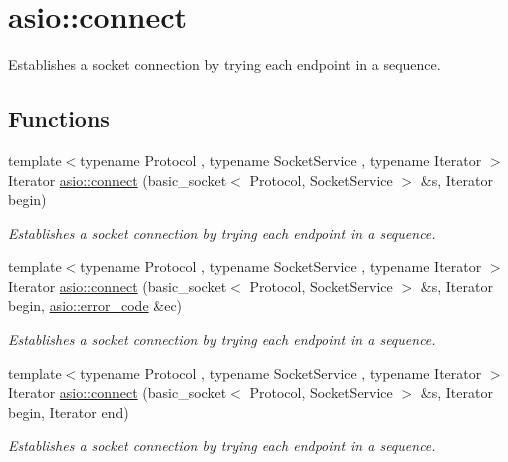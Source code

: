 \hypertarget{group__connect}{}\section{asio\+:\+:connect}
\label{group__connect}


Establishes a socket connection by trying each endpoint in a sequence.  


\subsection*{Functions}
\begin{DoxyCompactItemize}
\item 
{\footnotesize template$<$typename Protocol , typename Socket\+Service , typename Iterator $>$ }\\Iterator \hyperlink{group__connect_ga29acd61d7a875cef7dbd1f892be2906c}{asio\+::connect} (basic\+\_\+socket$<$ Protocol, Socket\+Service $>$ \&s, Iterator begin)
\begin{DoxyCompactList}\small\item\em Establishes a socket connection by trying each endpoint in a sequence. \end{DoxyCompactList}\item 
{\footnotesize template$<$typename Protocol , typename Socket\+Service , typename Iterator $>$ }\\Iterator \hyperlink{group__connect_ga1bb975e78fb1233032ba2b13a229cc8e}{asio\+::connect} (basic\+\_\+socket$<$ Protocol, Socket\+Service $>$ \&s, Iterator begin, \hyperlink{classasio_1_1error__code}{asio\+::error\+\_\+code} \&ec)
\begin{DoxyCompactList}\small\item\em Establishes a socket connection by trying each endpoint in a sequence. \end{DoxyCompactList}\item 
{\footnotesize template$<$typename Protocol , typename Socket\+Service , typename Iterator $>$ }\\Iterator \hyperlink{group__connect_ga8617a800bbe4f0e99be3826d8e48e60e}{asio\+::connect} (basic\+\_\+socket$<$ Protocol, Socket\+Service $>$ \&s, Iterator begin, Iterator end)
\begin{DoxyCompactList}\small\item\em Establishes a socket connection by trying each endpoint in a sequence. \end{DoxyCompactList}\item 

\end{DoxyCompactItemize}
